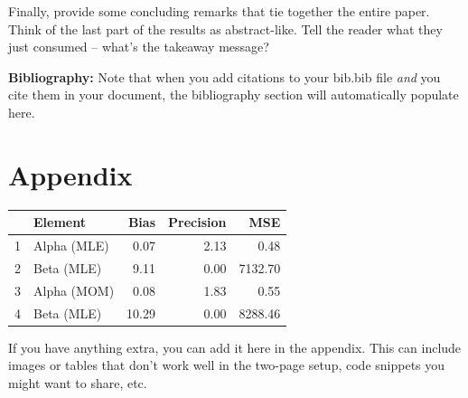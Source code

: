 \documentclass{article}\usepackage[]{graphicx}\usepackage[]{xcolor}
\begin{document}
\begin{multicols}{2}
Finally, provide some concluding remarks that tie together the entire paper. Think of the last part of the results as abstract-like. Tell the reader what they just consumed -- what's the takeaway message?

\vspace{2em}

\noindent\textbf{Bibliography:} Note that when you add citations to your bib.bib file \emph{and}
you cite them in your document, the bibliography section will automatically populate here.

\begin{tiny}

\end{tiny}
\end{multicols}

\newpage
\onecolumn
\section{Appendix}
\begin{table}[ht]
\centering
\begin{tabular}{rlrrr}
  \hline
 & Element & Bias & Precision & MSE \\ 
  \hline
1 & Alpha (MLE) & 0.07 & 2.13 & 0.48 \\ 
  2 & Beta (MLE) & 9.11 & 0.00 & 7132.70 \\ 
  3 & Alpha (MOM) & 0.08 & 1.83 & 0.55 \\ 
  4 & Beta (MLE) & 10.29 & 0.00 & 8288.46 \\ 
   \hline
\end{tabular}
\end{table}
If you have anything extra, you can add it here in the appendix. This can include images or tables that don't work well in the two-page setup, code snippets you might want to share, etc.
\end{document}
